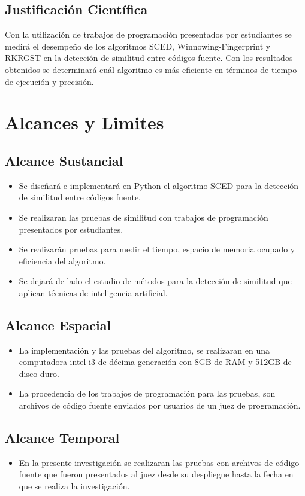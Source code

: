 \subsection{Justificación Científica}
Con la utilización de trabajos de programación presentados por estudiantes se medirá el desempeño de los algoritmos SCED, Winnowing-Fingerprint y RKRGST en la detección de similitud entre códigos fuente. Con los resultados obtenidos se determinará cuál algoritmo es más eficiente en términos de tiempo de ejecución y precisión.
\section{Alcances y Limites}
\subsection{Alcance Sustancial}
\begin{itemize}
    \item Se diseñará e implementará en Python el algoritmo SCED para la detección de similitud entre códigos fuente.
    \item Se realizaran las pruebas de similitud con trabajos de programación presentados por estudiantes.
    \item Se realizarán pruebas para medir el tiempo, espacio de memoria ocupado y eficiencia del algoritmo.
    \item Se dejará de lado el estudio de métodos para la detección de similitud que aplican técnicas de inteligencia artificial.
\end{itemize}
\subsection{Alcance Espacial}
\begin{itemize}
  \item La implementación y las pruebas del algoritmo, se realizaran en una computadora intel i3 de décima generación con 8GB de RAM y 512GB de disco duro.
  \item La procedencia de los trabajos de programación para las pruebas, son archivos de código fuente enviados por usuarios de un juez de programación.
\end{itemize}
\subsection{Alcance Temporal}
\begin{itemize}
  \item En la presente investigación se realizaran las pruebas con archivos de código fuente que fueron presentados al juez desde su despliegue hasta la fecha en que se realiza la investigación.
\end{itemize}
